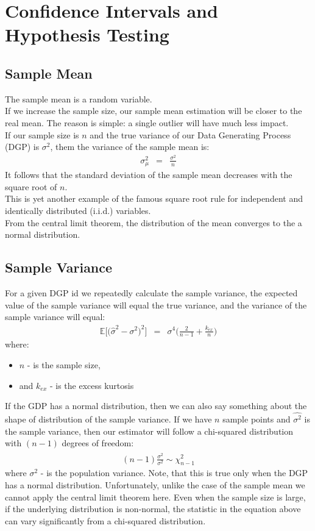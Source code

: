 \chapter{Confidence Intervals and Hypothesis Testing}

\section{Sample Mean}
The sample mean is a random variable.\\
If we increase the sample size, our sample mean estimation will be closer to the real mean. The reason is simple: a single outlier will have much less impact.\\
If our sample size is $n$ and the true variance of our Data Generating Process (DGP) is $\sigma^{2}$, them the variance of the sample mean is:
\begin{eqnarray}
	\sigma_{\mu}^{2} &=& \frac{\sigma^{2}}{n}
\end{eqnarray}
It follows that the standard deviation of the sample mean decreases with the square root of $n$.\\
This is yet another example of the famous square root rule for independent and identically distributed (i.i.d.) variables.\\
From the central limit theorem, the distribution of the mean converges to the a normal distribution.


\section{Sample Variance}
For a given DGP id we repeatedly calculate the sample variance, the expected value of the sample variance will equal the true variance, and the variance of the sample variance will equal:
\begin{eqnarray}
	\mathbb{E}\Big[\big(\hat{\sigma}^{2} - \sigma^{2}\big)^{2}\Big] &=& \sigma^{4}\bigg(\frac{2}{n - 1} + \frac{k_{ex}}{n}\bigg)
\end{eqnarray}
where:
\begin{itemize}
	\item $n$ - is the sample size,
	\item and $k_{ex}$ -  is the excess kurtosis
\end{itemize}
If the GDP has a normal distribution, then we can also say something about the shape of distribution of the sample variance. If we have $n$ sample points and $\hat{\sigma^{2}}$ is the sample variance, then our estimator will follow a chi-squared distribution with $(n - 1)$ degrees of freedom:
\begin{eqnarray}
	(n - 1)\frac{\hat{\sigma^{2}}}{\sigma^{2}} \sim \chi_{n - 1}^{2}
\end{eqnarray}
where $\sigma^{2}$ - is the population variance. Note, that this is true only when the DGP has a normal distribution. Unfortunately, unlike the case of the sample mean we cannot apply the central limit theorem here. Even when the sample size is large, if the underlying distribution is non-normal, the statistic in the equation above can vary significantly from a chi-squared distribution.



